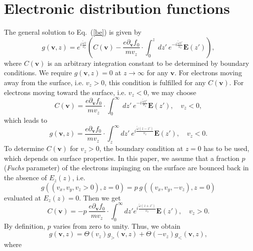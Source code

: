\documentclass[aps,reprint]{revtex4-1}
\begin{document}
\appendix
\section{Electronic distribution functions}
\label{sec:edf}
The general solution to Eq.~(\ref{be}) is given by 
\begin{equation}
g(\mathbf{v},z) = e^{i\frac{\tilde{\omega}z}{v_z}}\left(C(\mathbf{v})-\frac{e\partial_{\mathbf{v}}f_0}{mv_z}\cdot \int^z_0~dz'~e^{-i\frac{\tilde{\omega}z'}{v_z}}\mathbf{E}(z')\right), \label{b1}
\end{equation}
where $C(\mathbf{v})$ is an arbitrary integration constant to be determined by boundary conditions. We require $g(\mathbf{v},z)=0$ at $z\rightarrow\infty$ for any $\mathbf{v}$. For electrons moving away from the surface, i.e. $v_z>0$, this condition is fulfilled for any $C(\mathbf{v})$. For electrons moving toward the surface, i.e. $v_z<0$, we may choose 
\begin{equation}
C(\mathbf{v}) = \frac{e\partial_{\mathbf{v}}f_0}{mv_z}\cdot \int^{\infty}_0~dz'~e^{-i\frac{\tilde{\omega}z'}{v_z}}\mathbf{E}(z'), \quad v_z<0,
\end{equation}
which leads to 
\begin{equation}
g(\mathbf{v},z) = \frac{e\partial_{\mathbf{v}}f_0}{mv_z}\cdot \int^{\infty}_zdz' ~e^{i\frac{\tilde{\omega}(z-z')}{v_z}}\mathbf{E}(z'), \quad v_z<0. 
\end{equation}
To determine $C(\mathbf{v})$ for $v_z>0$, the boundary condition at $z=0$ has to be used, which depends on surface properties. In this paper, we assume that a fraction $p$ (\textit{Fuchs} parameter) of the electrons impinging on the surface are bounced back in the absence of $E_z(z)$, i.e. $$g\left((v_x,v_y,v_z>0),z=0\right)=p~g\left((v_x,v_y,-v_z),z=0\right)$$ evaluated at $E_z(z)=0$. Then we get 
\begin{equation}
C(\mathbf{v}) = - p~\frac{e\partial_{\mathbf{v}}f_0}{mv_z}\cdot \int^{\infty}_0dz' e^{i\frac{\tilde{\omega}(z+z')}{v_z}}\mathbf{E}(z'), \quad v_z>0.
\end{equation}
By definition, $p$ varies from zero to unity. Thus, we obtain $$g(\mathbf{v},z) = \Theta(v_z)g_{>}(\mathbf{v},z) +
 \Theta(-v_z)g_{<}(\mathbf{v},z),$$ where 
\end{document}
